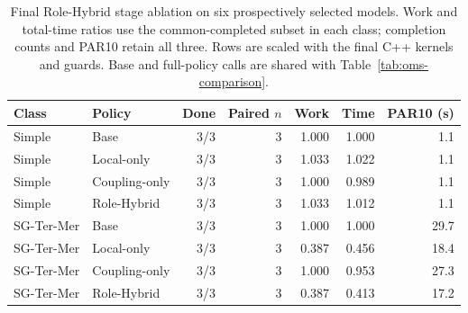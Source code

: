 \begin{table}[tb]
\centering\small
\caption{Final Role-Hybrid stage ablation on six prospectively selected models.
Work and total-time ratios use the common-completed subset in each class;
completion counts and PAR10 retain all three. Rows are scaled with the final C++
kernels and guards. Base and full-policy calls are shared with
Table~\ref{tab:oms-comparison}.}\label{tab:oms-ablation}
\begin{tabular}{llrrrrr}\toprule
Class & Policy & Done & Paired $n$ & Work & Time & PAR10 (s)\\\midrule
Simple & Base & 3/3 & 3 & 1.000 & 1.000 & 1.1 \\
Simple & Local-only & 3/3 & 3 & 1.033 & 1.022 & 1.1 \\
Simple & Coupling-only & 3/3 & 3 & 1.000 & 0.989 & 1.1 \\
Simple & Role-Hybrid & 3/3 & 3 & 1.033 & 1.012 & 1.1 \\
SG-Ter-Mer & Base & 3/3 & 3 & 1.000 & 1.000 & 29.7 \\
SG-Ter-Mer & Local-only & 3/3 & 3 & 0.387 & 0.456 & 18.4 \\
SG-Ter-Mer & Coupling-only & 3/3 & 3 & 1.000 & 0.953 & 27.3 \\
SG-Ter-Mer & Role-Hybrid & 3/3 & 3 & 0.387 & 0.413 & 17.2 \\
\bottomrule\end{tabular}\end{table}
